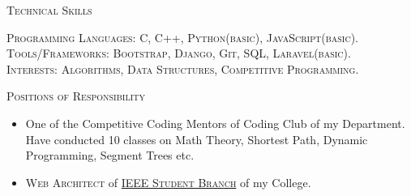 \documentclass[11pt]{article}
\begin{document}
		{\centering\Large{\textsc{Technical Skills}}\hrulefill}
	
	\vspace{3mm}

	\normalsize{
	\textsc{Programming Languages:} \textsc{C, C++, Python(basic), JavaScript(basic).} \\
	\textsc{Tools/Frameworks:} \textsc{Bootstrap, Django, Git, SQL, Laravel(basic).}
	}\\
	\textsc{Interests:} \textsc{Algorithms, Data Structures, Competitive Programming.}
			
	\vspace{3mm}
	{\centering\Large{\textsc{Positions of Responsibility}}	\hrulefill}
		
	\vspace{1mm}		
	\setlength\itemsep{-0.25em}
	\begin{normalsize}
	
	\begin{itemize}

	\item One of the Competitive Coding Mentors of Coding Club of my Department. Have conducted 10 classes on Math Theory, Shortest Path, Dynamic Programming, Segment Trees etc.
	\item \textsc{Web Architect} of \textsc{\href{https://github.com/SSN-IEEE}{IEEE Student Branch}} of my College.
	\end{itemize}	
	\end{normalsize}
\end{document}
